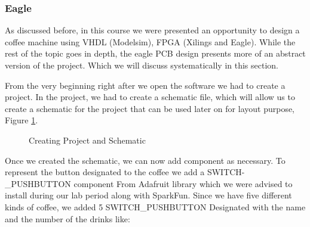 \documentclass[12pt]{article}
\begin{document}
\subsubsection{Eagle}

As discussed before, in this course we were presented an opportunity to design a coffee machine using VHDL (Modelsim), FPGA (Xilings and Eagle). While the rest of the topic goes in depth, the eagle PCB design presents more of an abstract version of the project. Which we will discuss systematically in this section.

From the very beginning right after we open the software we had to create a project. In the project, we had to create a schematic file, which will allow us to create a schematic for the project that can be used later on for layout purpose, Figure \ref{fig:eagle1}.

\begin{figure}[H]
\caption{Creating Project and Schematic}
\label{fig:eagle1}
\end{figure}

Once we created the schematic, we can now add component as necessary. To represent the button designated to the coffee we add a SWITCH- \_PUSHBUTTON component From Adafruit library which we were advised to install during our lab period along with SparkFun. Since we have five different kinds of coffee, we added 5 SWITCH\_PUSHBUTTON Designated with the name and the number of the drinks like:
\end{document}
